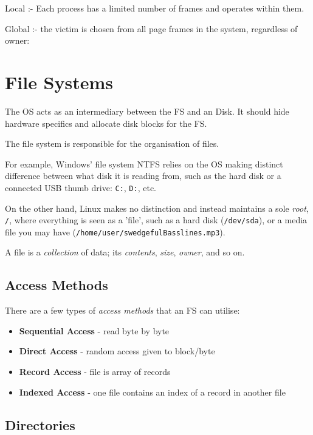 \documentclass[a4]{article}
\begin{document}
Local :- Each process has a limited number of frames and operates within them.

Global :- the victim is chosen from all page frames in the system, regardless of owner:




\filbreak
\section{File Systems}

The OS acts as an intermediary between the FS and an Disk. It should hide hardware specifics and allocate disk blocks for the FS.

The file system is responsible for the organisation of files.

For example, Windows' file system NTFS relies on the OS making distinct difference between what disk it is reading from, such as the hard disk or a connected USB thumb drive: \texttt{C:}, \texttt{D:}, etc.

On the other hand, Linux makes no distinction and instead maintains a sole \textit{root}, \texttt{/}, where everything is seen as a 'file', such as a hard disk (\texttt{/dev/sda}), or a media file you may have (\texttt{/home/user/swedgefulBasslines.mp3}). %

A file is a \textit{collection} of data; its \textit{contents}, \textit{size}, \textit{owner}, and so on.

\subsection{Access Methods}

There are a few types of \textit{access methods} that an FS can utilise:

\begin{itemize}
\item
  \textbf{Sequential Access} - read byte by byte
\item
  \textbf{Direct Access} - random access given to block/byte
\item
  \textbf{Record Access} - file is array of records
\item
  \textbf{Indexed Access} - one file contains an index of a record in another file
\end{itemize}

\subsection{Directories}
\end{document}
